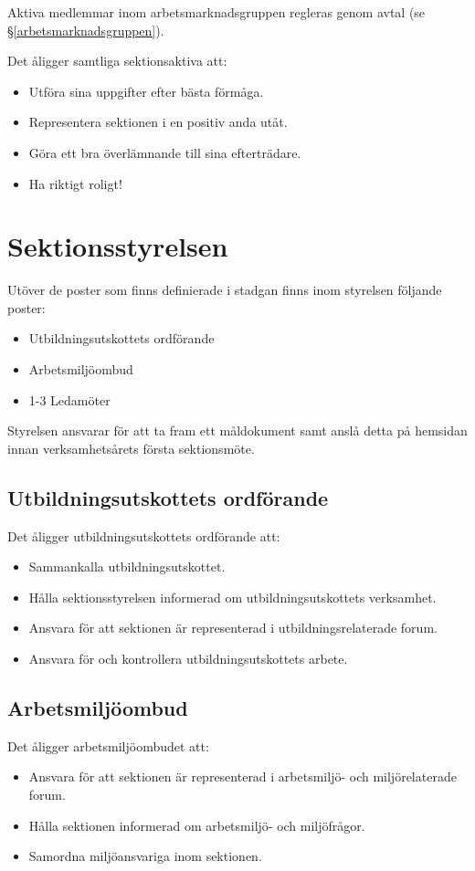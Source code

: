 \documentclass{datateknologsektionen-document}
\begin{document}
Aktiva medlemmar inom arbetsmarknadsgruppen regleras genom avtal (se \S \ref{arbetsmarknadsgruppen}).

Det åligger samtliga sektionsaktiva att:
\begin{itemize}
  \item Utföra sina uppgifter efter bästa förmåga.
  \item Representera sektionen i en positiv anda utåt.
  \item Göra ett bra överlämnande till sina efterträdare.
  \item Ha riktigt roligt!
\end{itemize}

\section{Sektionsstyrelsen}
Utöver de poster som finns definierade i stadgan finns inom styrelsen följande poster:
\begin{itemize}
  \item Utbildningsutskottets ordförande
  \item Arbetsmiljöombud
  \item 1-3 Ledamöter
\end{itemize}

Styrelsen ansvarar för att ta fram ett måldokument samt anslå detta på hemsidan
innan verksamhetsårets första sektionsmöte.

\subsection{Utbildningsutskottets ordförande}
\label{utbuordf}
Det åligger utbildningsutskottets ordförande att:
\begin{itemize}
  \item Sammankalla utbildningsutskottet.
  \item Hålla sektionsstyrelsen informerad om utbildningsutskottets verksamhet.
  \item Ansvara för att sektionen är representerad i utbildningsrelaterade forum.
  \item Ansvara för och kontrollera utbildningsutskottets arbete.
\end{itemize}

\subsection{Arbetsmiljöombud}
\label{amo}
Det åligger arbetsmiljöombudet att:
\begin{itemize}
  \item Ansvara för att sektionen är representerad i arbetsmiljö- och miljörelaterade forum.
  \item Hålla sektionen informerad om arbetsmiljö- och miljöfrågor.
  \item Samordna miljöansvariga inom sektionen.
\end{itemize}
\end{document}
